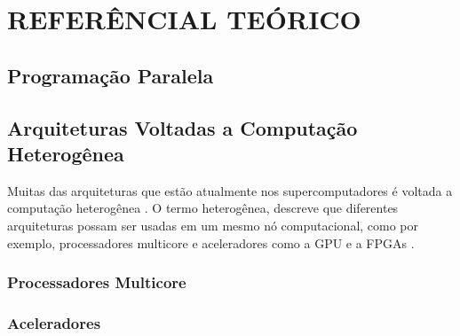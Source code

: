 
\chapter{REFERÊNCIAL TEÓRICO}
\label{chap:ref-teorico}

\section{Programação Paralela}

\section{Arquiteturas Voltadas a Computação Heterogênea}
Muitas das arquiteturas que estão atualmente nos supercomputadores é voltada a computação heterogênea \cite{meuer2014top500}.
O termo heterogênea, descreve que diferentes arquiteturas possam ser usadas em um mesmo nó computacional, como por exemplo, processadores multicore e aceleradores como a GPU e a FPGAs \cite{intrArqHete:2012}.

\subsection{Processadores Multicore}
\subsection{Aceleradores}


